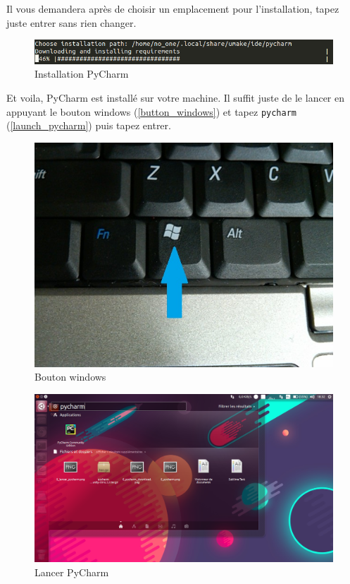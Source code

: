 \documentclass[12pt]{article}
\newcommand{\code}[1]{\colorbox{light-gray}{\texttt{#1}}}
\begin{document}
            Il vous demandera après de choisir un emplacement pour l'installation, tapez juste entrer sans rien changer.

            \begin{figure}[H]
                \centering
                \includegraphics[width=\linewidth]{img/8_1_installer_pycharm.png}
                \caption{Installation PyCharm}
            \end{figure}

            Et voila, PyCharm est installé sur votre machine. Il suffit juste de le lancer en appuyant le bouton
            windows (\autoref{button_windows}) et tapez \code{pycharm} (\autoref{launch_pycharm}) puis tapez entrer.

            \begin{figure}[H]
                \centering
                \includegraphics[width=0.5\linewidth]{img/8_windows_button.jpg}
                \caption{Bouton windows}
                \label{button_windows}
            \end{figure}

            \begin{figure}[H]
                \centering
                \includegraphics[width=\linewidth]{img/8_lancer_pycharm.png}
                \caption{Lancer PyCharm}
                \label{launch_pycharm}
            \end{figure}
\end{document}
